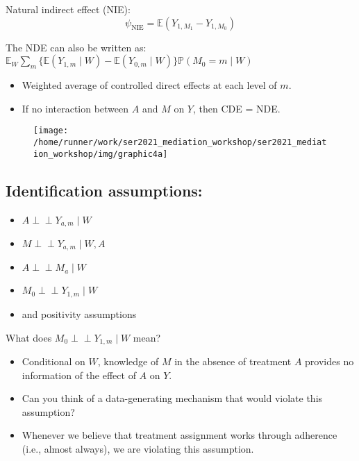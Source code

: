 \documentclass[
  12pt,
]{book}
\providecommand{\tightlist}{%
  \setlength{\itemsep}{0pt}\setlength{\parskip}{0pt}}
\theoremstyle{definition}
\theoremstyle{definition}
\theoremstyle{definition}
\newcommand{\indep}{\mbox{$\perp\!\!\!\perp$}}
\renewcommand{\P}{\mathbb{P}}
\newcommand{\E}{\mathbb{E}}
\newcommand{\1}{\mathbbm{1}}
\begin{document}
Natural indirect effect (NIE):
\begin{equation*}
  \psi_{\text{NIE}} = \E(Y_{1,M_1} - Y_{1,M_0})
\end{equation*}

The NDE can also be written as: \(\E_W \sum_m \{\E(Y_{1,m} \mid W) - \E(Y_{0,m} \mid W)\} \P(M_{0}=m \mid W)\)

\begin{itemize}
\tightlist
\item
  Weighted average of controlled direct effects at each level of \(m\).
\item
  If no interaction between \(A\) and \(M\) on \(Y\), then CDE = NDE.
\end{itemize}

\begin{figure}

{\centering \texttt{[image: /home/runner/work/ser2021\_mediation\_workshop/ser2021\_mediation\_workshop/img/graphic4a]} 

}

\end{figure}

\hypertarget{identification-assumptions-1}{%
\subsection{Identification assumptions:}\label{identification-assumptions-1}}

\begin{itemize}
\tightlist
\item
  \(A \indep Y_{a,m} \mid W\)
\item
  \(M \indep Y_{a,m} \mid W, A\)
\item
  \(A \indep M_a \mid W\)
\item
  \(M_0 \indep Y_{1,m} \mid W\)
\item
  and positivity assumptions
\end{itemize}

What does \(M_0 \indep Y_{1,m} \mid W\) mean?

\begin{itemize}
\tightlist
\item
  Conditional on \(W\), knowledge of \(M\) in the absence of treatment \(A\)
  provides no information of the effect of \(A\) on \(Y\).
\item
  Can you think of a data-generating mechanism that would violate this
  assumption?
\item
  Whenever we believe that treatment assignment works through adherence (i.e., almost
  always), we are violating this assumption.
\end{itemize}
\end{document}
